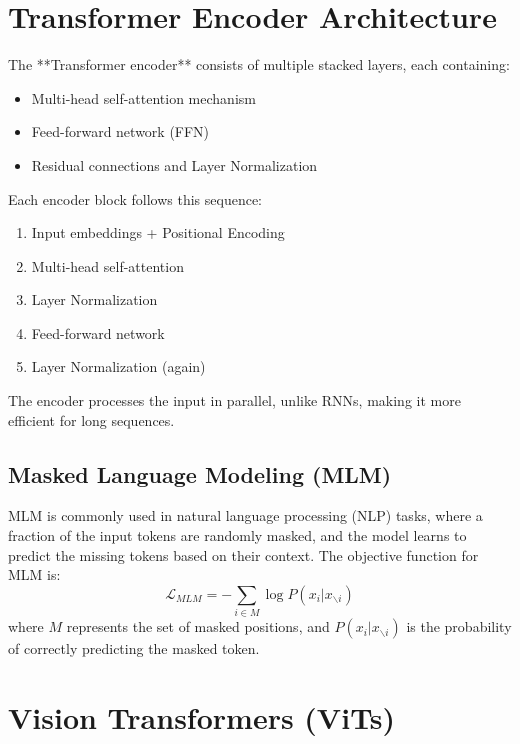 \documentclass[
]{book}
\begin{document}
\chapter{Transformer Encoder Architecture}\label{transformer-encoder-architecture-1}

The **Transformer encoder** consists of multiple stacked layers,
each containing:

\begin{itemize}
\item
  Multi-head self-attention mechanism
\item
  Feed-forward network (FFN)
\item
  Residual connections and Layer Normalization
\end{itemize}

Each encoder block follows this sequence:

\begin{enumerate}
\def\labelenumi{\arabic{enumi}.}
\item
  Input embeddings + Positional Encoding
\item
  Multi-head self-attention
\item
  Layer Normalization
\item
  Feed-forward network
\item
  Layer Normalization (again)
\end{enumerate}

The encoder processes the input in parallel, unlike RNNs, making it more
efficient for long sequences.

\section{Masked Language Modeling (MLM)}\label{masked-language-modeling-mlm-1}

MLM is commonly used in natural language processing (NLP) tasks, where a
fraction of the input tokens are randomly masked, and the model learns
to predict the missing tokens based on their context. The objective
function for MLM is:
\[\mathcal{L}_{MLM} = - \sum_{i \in M} \log P(x_i | x_{\backslash i})\]
where \(M\) represents the set of masked positions, and
\(P(x_i | x_{\backslash i})\) is the probability of correctly predicting
the masked token.

\chapter{Vision Transformers (ViTs)}\label{vision-transformers-vits-1}
\end{document}
